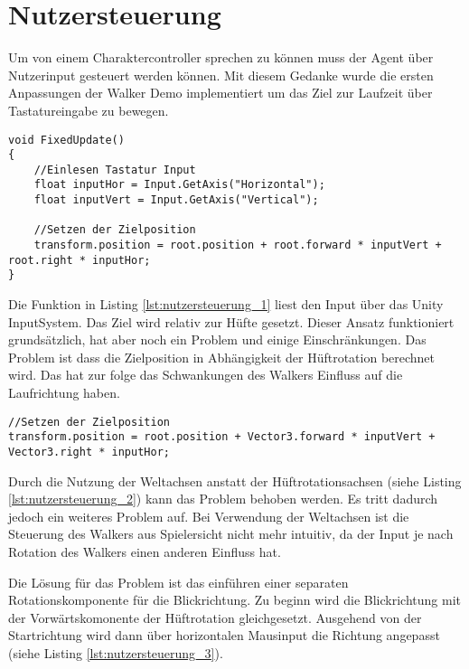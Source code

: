 \section{Nutzersteuerung}
Um von einem Charaktercontroller sprechen zu können muss der Agent über Nutzerinput gesteuert werden können. Mit diesem Gedanke wurde die ersten Anpassungen der Walker Demo implementiert um das Ziel zur Laufzeit über Tastatureingabe zu bewegen.
\begin{lstlisting}[caption={Nutzersteuerung erster Prototyp},captionpos=b,label={lst:nutzersteuerung_1}]
void FixedUpdate()
{
    //Einlesen Tastatur Input
    float inputHor = Input.GetAxis("Horizontal");
    float inputVert = Input.GetAxis("Vertical");
        
    //Setzen der Zielposition
    transform.position = root.position + root.forward * inputVert + root.right * inputHor;
}
\end{lstlisting}
Die Funktion in Listing \ref{lst:nutzersteuerung_1} liest den Input über das Unity InputSystem. Das Ziel wird relativ zur Hüfte gesetzt. Dieser Ansatz funktioniert grundsätzlich, hat aber noch ein Problem und einige Einschränkungen. Das Problem ist dass die Zielposition in Abhängigkeit der Hüftrotation berechnet wird. Das hat zur folge das Schwankungen des Walkers Einfluss auf die Laufrichtung haben.

\begin{lstlisting}[caption={Nutzersteuerung berechnung mit Weltachsen},captionpos=b,label={lst:nutzersteuerung_2}]
//Setzen der Zielposition
transform.position = root.position + Vector3.forward * inputVert + Vector3.right * inputHor;
\end{lstlisting}
Durch die Nutzung der Weltachsen anstatt der Hüftrotationsachsen (siehe Listing \ref{lst:nutzersteuerung_2}) kann das Problem behoben werden. Es tritt dadurch jedoch ein weiteres Problem auf. Bei Verwendung der Weltachsen ist die Steuerung des Walkers aus Spielersicht nicht mehr intuitiv, da der Input je nach Rotation des Walkers einen anderen Einfluss hat.

Die Lösung für das Problem ist das einführen einer separaten Rotationskomponente für die Blickrichtung. Zu beginn wird die Blickrichtung mit der Vorwärtskomonente der Hüftrotation gleichgesetzt. Ausgehend von der Startrichtung wird dann über horizontalen Mausinput die Richtung angepasst (siehe Listing \ref{lst:nutzersteuerung_3}).

